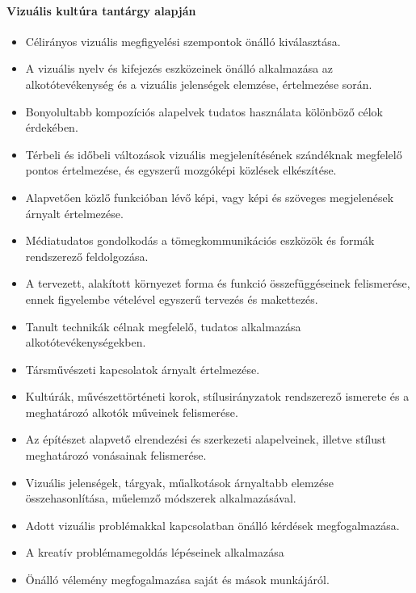 \paragraph{Vizuális kultúra tantárgy alapján}
\begin{itemize}
\item Célirányos vizuális megfigyelési szempontok önálló kiválasztása.
\item A vizuális nyelv és kifejezés eszközeinek önálló alkalmazása az alkotótevékenység és a vizuális jelenségek elemzése, értelmezése során.
\item Bonyolultabb kompozíciós alapelvek tudatos használata kölönböző célok érdekében.
\item Térbeli és időbeli változások vizuális megjelenítésének szándéknak megfelelő pontos értelmezése, és egyszerű mozgóképi közlések elkészítése.
\item Alapvetően közlő funkcióban lévő képi, vagy képi és szöveges  megjelenések árnyalt értelmezése.
\item Médiatudatos gondolkodás a tömegkommunikációs eszközök és formák rendszerező feldolgozása.
\item A tervezett, alakított környezet forma és funkció összefüggéseinek felismerése, ennek figyelembe vételével egyszerű tervezés és makettezés.
\item Tanult technikák célnak megfelelő, tudatos alkalmazása alkotótevékenységekben.
\item Társművészeti kapcsolatok árnyalt értelmezése.
\item Kultúrák, művészettörténeti korok, stílusirányzatok rendszerező ismerete és a meghatározó alkotók műveinek felismerése.
\item Az építészet alapvető elrendezési és szerkezeti alapelveinek, illetve stílust meghatározó vonásainak felismerése.
\item Vizuális jelenségek, tárgyak, műalkotások árnyaltabb elemzése összehasonlítása, műelemző módszerek alkalmazásával.
\item Adott vizuális problémakkal kapcsolatban önálló kérdések megfogalmazása.
\item A kreatív problémamegoldás lépéseinek alkalmazása
\item Önálló vélemény megfogalmazása saját és mások munkájáról.
\end{itemize}
